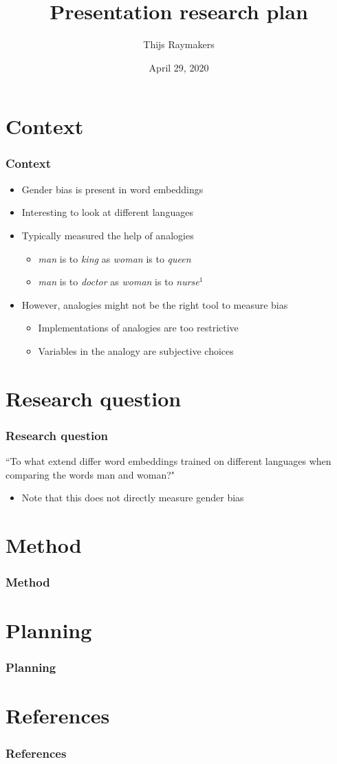 \documentclass{beamer}
\author{Thijs Raymakers}
\title{Presentation research plan}
\date{April 29, 2020}
\begin{document}
\section{Context}
\begin{frame}
\frametitle{Context}
\begin{itemize}
    \item Gender bias is present in word embeddings~
    \pause
    \item Interesting to look at different languages
    \pause
    \item Typically measured the help of analogies
    \begin{itemize}
        \item \textit{man} is to \textit{king} as \textit{woman} is to \textit{queen}
        \item \textit{man} is to \textit{doctor} as \textit{woman} is to \textit{nurse}$^1$
    \end{itemize}
    \pause
    \item However, analogies might not be the right tool to measure bias 
    \begin{itemize}
        \item Implementations of analogies are too restrictive
        \item Variables in the analogy are subjective choices
    \end{itemize}
\end{itemize}
\end{frame}

\section{Research question}
\begin{frame}
\frametitle{Research question}

``To what extend differ word embeddings trained on different languages when comparing
the words man and woman?"

\pause
\begin{itemize}
    \item Note that this does not directly measure gender bias
\end{itemize}

\end{frame}

\section{Method}
\begin{frame}
\frametitle{Method}
\end{frame}

\section{Planning}
\begin{frame}
\frametitle{Planning}
\end{frame}

\section{References}
\begin{frame}[allowframebreaks]
\frametitle{References}
\printbibliography[heading=none]
\end{frame}
\end{document}
